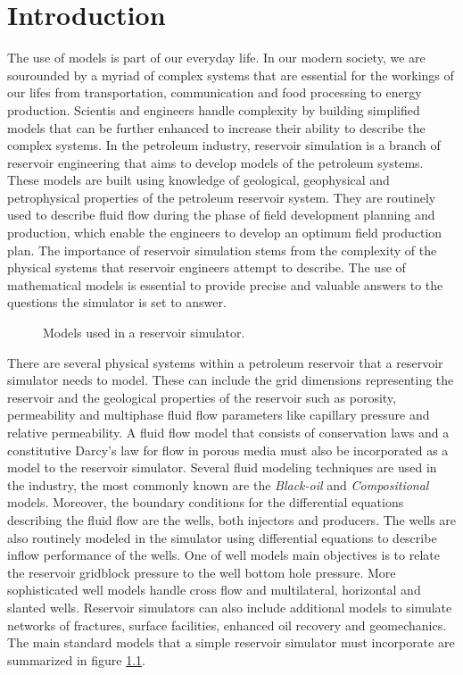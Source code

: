 \chapter{Introduction}
The use of models is part of our everyday life. In our modern society, we are sourounded by a myriad of complex systems that are
essential for the workings of our lifes from transportation, communication and food processing to energy production. Scientis and engineers
handle complexity by building simplified models that can be further enhanced to increase their ability to describe the complex systems.
In the petroleum industry, reservoir simulation is a branch of reservoir engineering that aims to develop models of the petroleum systems.
These models are built using knowledge of geological, geophysical and petrophysical properties of the petroleum reservoir system.
They are routinely used to describe fluid flow during the phase of field development planning and production, which enable the engineers 
to develop an optimum field production plan. The importance of reservoir simulation stems from the complexity of the physical systems that reservoir 
engineers attempt to describe. The use of mathematical models is essential to provide precise and valuable answers to the questions the simulator is 
set to answer. 

\begin{figure}[htb]
\centering
\resizebox{15cm}{!}{}
\caption{Models used in a reservoir simulator.}\label{models}
\end{figure}

There are several physical systems within a petroleum reservoir that a reservoir simulator needs to model. 
These can include the grid dimensions representing the reservoir and the geological properties of the reservoir such as porosity, 
permeability and multiphase fluid flow parameters like capillary pressure and relative permeability. A fluid flow model that consists of 
conservation laws and a constitutive Darcy's law for flow in porous media must also be incorporated as a model to the reservoir simulator.
Several fluid modeling techniques are used in the industry, the most commonly known are the \textit{Black-oil} and \textit{Compositional} models.
Moreover, the boundary conditions for the differential equations describing the fluid flow are the wells, both injectors and producers. 
The wells are also routinely modeled in the simulator using differential equations to describe inflow performance of the wells. One of well models
main objectives is to relate the reservoir gridblock pressure to the well bottom hole pressure. More sophisticated well models handle cross flow and
multilateral, horizontal and slanted wells. Reservoir simulators can also include additional models to simulate networks of fractures, surface facilities,
enhanced oil recovery and geomechanics. The main standard models that a simple reservoir simulator must incorporate are summarized in figure \ref{models}.


